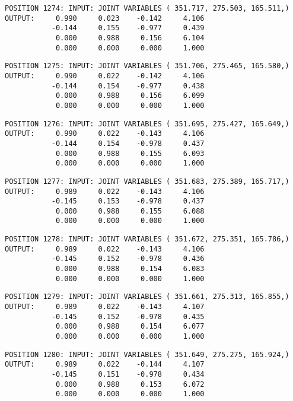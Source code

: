 \begin{verbatim}
POSITION 1274: INPUT: JOINT VARIABLES ( 351.717, 275.503, 165.511,)
OUTPUT:     0.990     0.023    -0.142     4.106
           -0.144     0.155    -0.977     0.439
            0.000     0.988     0.156     6.104
            0.000     0.000     0.000     1.000
\end{verbatim} \pagebreak[1]\begin{verbatim}
POSITION 1275: INPUT: JOINT VARIABLES ( 351.706, 275.465, 165.580,)
OUTPUT:     0.990     0.022    -0.142     4.106
           -0.144     0.154    -0.977     0.438
            0.000     0.988     0.156     6.099
            0.000     0.000     0.000     1.000
\end{verbatim} \pagebreak[1]\begin{verbatim}
POSITION 1276: INPUT: JOINT VARIABLES ( 351.695, 275.427, 165.649,)
OUTPUT:     0.990     0.022    -0.143     4.106
           -0.144     0.154    -0.978     0.437
            0.000     0.988     0.155     6.093
            0.000     0.000     0.000     1.000
\end{verbatim} \pagebreak[1]\begin{verbatim}
POSITION 1277: INPUT: JOINT VARIABLES ( 351.683, 275.389, 165.717,)
OUTPUT:     0.989     0.022    -0.143     4.106
           -0.145     0.153    -0.978     0.437
            0.000     0.988     0.155     6.088
            0.000     0.000     0.000     1.000
\end{verbatim} \pagebreak[1]\begin{verbatim}
POSITION 1278: INPUT: JOINT VARIABLES ( 351.672, 275.351, 165.786,)
OUTPUT:     0.989     0.022    -0.143     4.106
           -0.145     0.152    -0.978     0.436
            0.000     0.988     0.154     6.083
            0.000     0.000     0.000     1.000
\end{verbatim} \pagebreak[1]\begin{verbatim}
POSITION 1279: INPUT: JOINT VARIABLES ( 351.661, 275.313, 165.855,)
OUTPUT:     0.989     0.022    -0.143     4.107
           -0.145     0.152    -0.978     0.435
            0.000     0.988     0.154     6.077
            0.000     0.000     0.000     1.000
\end{verbatim} \pagebreak[1]\begin{verbatim}
POSITION 1280: INPUT: JOINT VARIABLES ( 351.649, 275.275, 165.924,)
OUTPUT:     0.989     0.022    -0.144     4.107
           -0.145     0.151    -0.978     0.434
            0.000     0.988     0.153     6.072
            0.000     0.000     0.000     1.000
\end{verbatim} \pagebreak[1]\begin{verbatim}

\end{verbatim}
